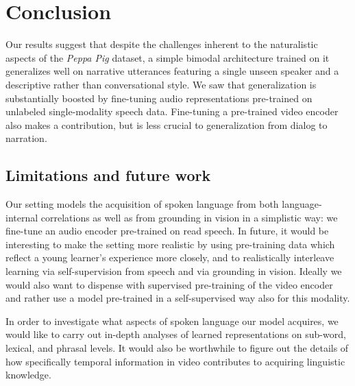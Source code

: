 \section{Conclusion}
\label{sec:conclusion}
Our results suggest that despite the challenges inherent to the
naturalistic aspects of the \emph{Peppa Pig} dataset, a simple bimodal
architecture trained on it generalizes well on narrative utterances
featuring a single unseen speaker and a descriptive rather than
conversational style. We saw that generalization is substantially
boosted by fine-tuning audio representations pre-trained on unlabeled
single-modality speech data. Fine-tuning a pre-trained video encoder
also makes a contribution, but is less crucial to generalization from
dialog to narration.


\subsection{Limitations and future work}
\label{sec:limitations}
Our setting models the acquisition of spoken language from both
language-internal correlations as well as from grounding in vision in
a simplistic way: we fine-tune an audio encoder pre-trained on read
speech.
In future, it would be interesting to make the setting
more realistic by using pre-training data which reflect a young
learner's experience more closely, and to realistically interleave learning via
self-supervision from speech and via grounding in vision.
Ideally we would also want to dispense with
supervised pre-training of the video encoder and rather use a model pre-trained in a
self-supervised way also for this modality.

In order to investigate what aspects of spoken language our model
acquires, we would like to carry out in-depth 
analyses of learned representations on sub-word, lexical, and phrasal
levels. It would also be worthwhile to figure out the details of how
specifically temporal information in video contributes to acquiring
linguistic knowledge.

